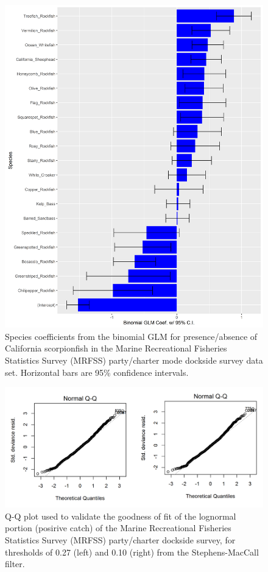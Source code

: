 \documentclass[12pt,]{article}
\begin{document}
\FloatBarrier

\begin{figure}[htbp]
\centering
\includegraphics{Figures/Fleet5_RecPC_dockside_SM.png}
\caption{Species coefficients from the binomial GLM for presence/absence
of California scorpionfish in the Marine Recreational Fisheries
Statistics Survey (MRFSS) party/charter mode dockside survey data set.
Horizontal bars are 95\% confidence intervals.
\label{fig:Fleet5_RecPC_docksideSM}}
\end{figure}

\begin{figure}[htbp]
\centering
\includegraphics{Figures/Fleet5_RecPC_dockside_QQ.png}
\caption{Q-Q plot used to validate the goodness of fit of the lognormal
portion (posirive catch) of the Marine Recreational Fisheries Statistics
Survey (MRFSS) party/charter dockside survey, for thresholds of 0.27
(left) and 0.10 (right) from the Stephens-MacCall filter.
\label{fig:Fleet5_RecPC_docksideQQ}}
\end{figure}
\end{document}
